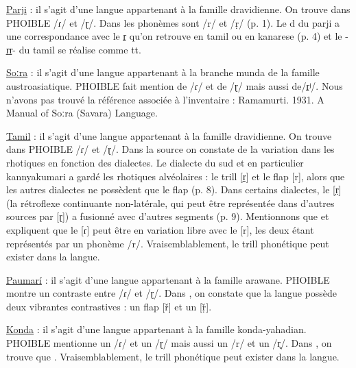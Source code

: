 \begin{exe}
\begin{xlist}
	\ex \href{https://glottolog.org/resource/languoid/id/duru1236}{Parji}  : il s'agit d'une langue appartenant à la famille dravidienne. On trouve dans PHOIBLE /ɾ/ et /ɽ/. Dans \textcite{bhattacharyaParjiLanguageDravidian1953} les phonèmes sont /r/ et /ṛ/ (p. 1). Le d du parji a une correspondance avec le r̠ qu'on retrouve en tamil ou en kanarese (p. 4) et le -r̠r̠- du tamil se réalise comme tt.  
	
	\ex \href{https://phoible.org/inventories/view/879}{Soːra}  : il s'agit d'une langue appartenant à la branche munda de la famille austroasiatique. PHOIBLE fait mention de /ɾ/ et de /ɽ/ mais aussi de/r̠ʲ/. Nous n'avons pas trouvé la référence associée à l'inventaire : Ramamurti. 1931. A Manual of Soːra (Savara) Language.
	
	\ex \href{https://phoible.org/inventories/view/1788}{Tamil}  : il s'agit d'une langue appartenant à la famille dravidienne. On trouve dans PHOIBLE /ɾ/ et /ɽ/. Dans la source \textcite{n.ramaswamiFormalInformalTamil1979} on constate de la variation dans les rhotiques en fonction des dialectes. Le dialecte du sud et en particulier kannyakumari a gardé les rhotiques alvéolaires : le trill [r̠] et le flap [r], alors que les autres dialectes ne possèdent que le flap (p. 8). Dans certains dialectes, le [r̤] (la rétroflexe continuante non-latérale, qui peut être représentée dans d'autres sources par [ɽ]) a fusionné avec d'autres segments (p. 9). Mentionnons que \textcite[92-94]{balasubramanianTwoTwoTamil1982} et \textcite[113]{keaneTamil2004} expliquent que le [ɾ] peut être en variation libre avec le [r], les deux étant représentés par un phonème /r/. Vraisemblablement, le trill phonétique peut exister dans la langue.
	
	\ex \href{https://phoible.org/inventories/view/879}{Paumarí}  : il s'agit d'une langue appartenant à la famille arawane. PHOIBLE montre un contraste entre /ɾ/ et /ɽ/. Dans \textcite[347]{chapmanPaumari1991}, on constate que la langue possède deux vibrantes contrastives : un flap [ř] et un  [ṛ̌]. 
	
	\ex \href{https://phoible.org/inventories/view/879}{Konda}  : il s'agit d'une langue appartenant à la famille konda-yahadian. PHOIBLE mentionne un /ɾ/ et un /ɽ/ mais aussi un /r/ et un /r̥/. Dans \textcite[243]{krishnamurtibh.Konda1998}, on trouve que . Vraisemblablement, le trill phonétique peut exister dans la langue.
	\end{xlist}

\end{exe}


